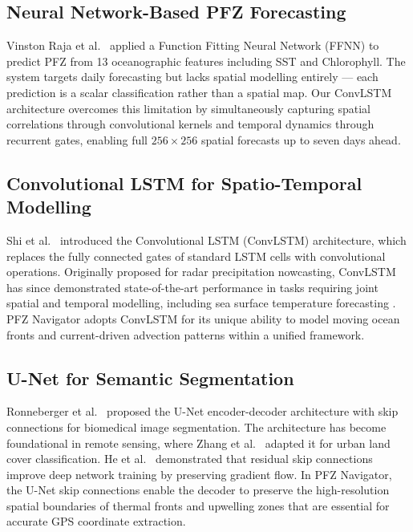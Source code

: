 \documentclass[conference]{IEEEtran}
\begin{document}
\subsection{Neural Network-Based PFZ Forecasting}

Vinston Raja et al.\ \cite{vinston2023} applied a Function Fitting
Neural Network (FFNN) to predict PFZ from 13 oceanographic features
including SST and Chlorophyll. The system targets daily forecasting
but lacks spatial modelling entirely --- each prediction is a scalar
classification rather than a spatial map. Our ConvLSTM architecture
overcomes this limitation by simultaneously capturing spatial
correlations through convolutional kernels and temporal dynamics
through recurrent gates, enabling full $256 \times 256$ spatial
forecasts up to seven days ahead.

\subsection{Convolutional LSTM for Spatio-Temporal Modelling}

Shi et al.\ \cite{shi2015} introduced the Convolutional LSTM
(ConvLSTM) architecture, which replaces the fully connected gates of
standard LSTM cells \cite{hochreiter1997} with convolutional
operations. Originally proposed for radar precipitation nowcasting,
ConvLSTM has since demonstrated state-of-the-art performance in tasks
requiring joint spatial and temporal modelling, including sea surface
temperature forecasting \cite{ham2019}. PFZ Navigator adopts ConvLSTM
for its unique ability to model moving ocean fronts and current-driven
advection patterns within a unified framework.

\subsection{U-Net for Semantic Segmentation}

Ronneberger et al.\ \cite{ronneberger2015} proposed the U-Net
encoder-decoder architecture with skip connections for biomedical
image segmentation. The architecture has become foundational in remote
sensing, where Zhang et al.\ \cite{zhang_unet2018} adapted it for
urban land cover classification. He et al.\ \cite{he2016} demonstrated
that residual skip connections improve deep network training by
preserving gradient flow. In PFZ Navigator, the U-Net skip connections
enable the decoder to preserve the high-resolution spatial boundaries
of thermal fronts and upwelling zones that are essential for accurate
GPS coordinate extraction.
\end{document}
